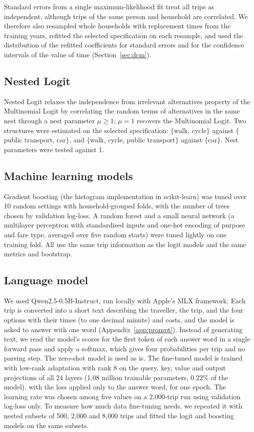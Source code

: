 \documentclass[11pt,a4paper]{article}
\begin{document}
Standard errors from a single maximum-likelihood fit treat all trips as independent, although trips of the same person and household are correlated. We therefore also resampled whole households with replacement \bootN{} times from the training years, refitted the selected specification on each resample, and used the distribution of the refitted coefficients for standard errors and for the confidence intervals of the value of time (Section~\ref{sec:dcm}).

\subsection{Nested Logit}
Nested Logit relaxes the independence from irrelevant alternatives property of the Multinomial Logit by correlating the random terms of alternatives in the same nest through a nest parameter $\mu \ge 1$; $\mu = 1$ recovers the Multinomial Logit. Two structures were estimated on the selected specification: $\{$walk, cycle$\}$ against $\{$public transport, car$\}$, and $\{$walk, cycle, public transport$\}$ against $\{$car$\}$. Nest parameters were tested against 1.

\subsection{Machine learning models}
Gradient boosting (the histogram implementation in scikit-learn) was tuned over 10 random settings with household-grouped folds, with the number of trees chosen by validation log-loss. A random forest and a small neural network (a multilayer perceptron with standardised inputs and one-hot encoding of purpose and fare type, averaged over five random starts) were tuned lightly on one training fold. All use the same trip information as the logit models and the same metrics and bootstrap.

\subsection{Language model}
We used Qwen2.5-0.5B-Instruct, run locally with Apple's MLX framework. Each trip is converted into a short text describing the traveller, the trip, and the four options with their times (to one decimal minute) and costs, and the model is asked to answer with one word (Appendix~\ref{app:prompt}). Instead of generating text, we read the model's scores for the first token of each answer word in a single forward pass and apply a softmax, which gives four probabilities per trip and no parsing step. The zero-shot model is used as is. The fine-tuned model is trained with low-rank adaptation \citep[LoRA;][]{hu2022lora} with rank 8 on the query, key, value and output projections of all 24 layers (1.08 million trainable parameters, 0.22\% of the model), with the loss applied only to the answer word, for one epoch. The learning rate was chosen among five values on a 2,000-trip run using validation log-loss only. To measure how much data fine-tuning needs, we repeated it with nested subsets of 500, 2,000 and 8,000 trips and fitted the logit and boosting models on the same subsets.
\end{document}

